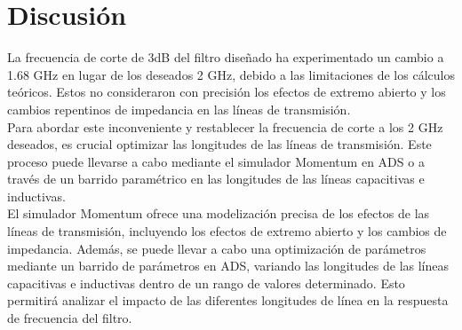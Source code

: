 \section{Discusión}
La frecuencia de corte de 3dB del filtro diseñado ha experimentado un cambio a 1.68 GHz en lugar de los deseados 2 GHz, debido a las limitaciones de los cálculos teóricos. Estos no consideraron con precisión los efectos de extremo abierto y los cambios repentinos de impedancia en las líneas de transmisión.  \\

Para abordar este inconveniente y restablecer la frecuencia de corte a los 2 GHz deseados, es crucial optimizar las longitudes de las líneas de transmisión. Este proceso puede llevarse a cabo mediante el simulador Momentum en ADS o a través de un barrido paramétrico en las longitudes de las líneas capacitivas e inductivas. \\

El simulador Momentum ofrece una modelización precisa de los efectos de las líneas de transmisión, incluyendo los efectos de extremo abierto y los cambios de impedancia. Además, se puede llevar a cabo una optimización de parámetros mediante un barrido de parámetros en ADS, variando las longitudes de las líneas capacitivas e inductivas dentro de un rango de valores determinado. Esto permitirá analizar el impacto de las diferentes longitudes de línea en la respuesta de frecuencia del filtro. \\
